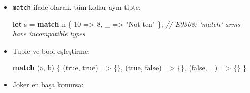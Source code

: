 \documentclass[12pt,a4paper]{article}
\newenvironment{Shaded}{}{}
\newcommand{\CommentTok}[1]{\textcolor[rgb]{0.38,0.63,0.69}{\textit{#1}}}
\newcommand{\ConstantTok}[1]{\textcolor[rgb]{0.53,0.00,0.00}{#1}}
\newcommand{\ControlFlowTok}[1]{\textcolor[rgb]{0.00,0.44,0.13}{\textbf{#1}}}
\newcommand{\DecValTok}[1]{\textcolor[rgb]{0.25,0.63,0.44}{#1}}
\newcommand{\KeywordTok}[1]{\textcolor[rgb]{0.00,0.44,0.13}{\textbf{#1}}}
\newcommand{\NormalTok}[1]{#1}
\newcommand{\OperatorTok}[1]{\textcolor[rgb]{0.40,0.40,0.40}{#1}}
\newcommand{\StringTok}[1]{\textcolor[rgb]{0.25,0.44,0.63}{#1}}
\begin{document}
\begin{itemize}
\begin{Shaded}
\begin{Highlighting}[]
\ControlFlowTok{match}\NormalTok{ n }\OperatorTok{\{}
\NormalTok{    x }\ControlFlowTok{if}\NormalTok{ x }\OperatorTok{\textless{}} \DecValTok{0} \OperatorTok{=\textgreater{}} \StringTok{"negative"}\OperatorTok{,}
    \DecValTok{0} \OperatorTok{=\textgreater{}} \StringTok{"zero"}\OperatorTok{,}
\NormalTok{    \_ }\OperatorTok{=\textgreater{}} \StringTok{"positive"}\OperatorTok{,}
\OperatorTok{\}}
\end{Highlighting}
\end{Shaded}


  Hata: guard'lar eksiksizlik hesabına \textbf{katılmaz}:

\begin{Shaded}
\begin{Highlighting}[]
\ControlFlowTok{match}\NormalTok{ n }\OperatorTok{\{}\NormalTok{ x }\ControlFlowTok{if}\NormalTok{ x }\OperatorTok{\textless{}} \DecValTok{0} \OperatorTok{=\textgreater{}} \DecValTok{1}\OperatorTok{,}\NormalTok{ x }\ControlFlowTok{if}\NormalTok{ x }\OperatorTok{\textgreater{}=} \DecValTok{0} \OperatorTok{=\textgreater{}} \DecValTok{2} \OperatorTok{\}}
\CommentTok{// E0004: non-exhaustive patterns: `\_` not covered}
\end{Highlighting}
\end{Shaded}
\item
  \texttt{match} ifade olarak, tüm kollar aynı tipte:

\begin{Shaded}
\begin{Highlighting}[]
\KeywordTok{let}\NormalTok{ s }\OperatorTok{=} \ControlFlowTok{match}\NormalTok{ n }\OperatorTok{\{} \DecValTok{10} \OperatorTok{=\textgreater{}} \DecValTok{8}\OperatorTok{,}\NormalTok{ \_ }\OperatorTok{=\textgreater{}} \StringTok{"Not ten"} \OperatorTok{\};}
\CommentTok{// E0308: `match` arms have incompatible types}
\end{Highlighting}
\end{Shaded}
\item
  Tuple ve bool eşleştirme:

\begin{Shaded}
\begin{Highlighting}[]
\ControlFlowTok{match} \OperatorTok{(}\NormalTok{a}\OperatorTok{,}\NormalTok{ b}\OperatorTok{)} \OperatorTok{\{} \OperatorTok{(}\ConstantTok{true}\OperatorTok{,} \ConstantTok{true}\OperatorTok{)} \OperatorTok{=\textgreater{}} \OperatorTok{\{\},} \OperatorTok{(}\ConstantTok{true}\OperatorTok{,} \ConstantTok{false}\OperatorTok{)} \OperatorTok{=\textgreater{}} \OperatorTok{\{\},} \OperatorTok{(}\ConstantTok{false}\OperatorTok{,}\NormalTok{ \_}\OperatorTok{)} \OperatorTok{=\textgreater{}} \OperatorTok{\{\}} \OperatorTok{\}}
\end{Highlighting}
\end{Shaded}
\item
  Joker en başa konursa:


\end{itemize}
\end{document}
